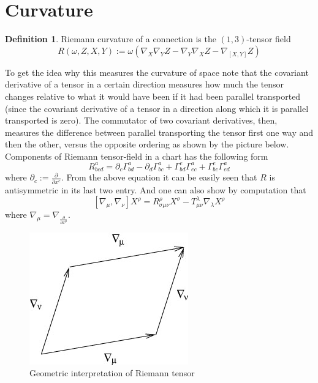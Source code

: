 \documentclass[a4paper]{report}
\theoremstyle{definition}
\newtheorem{definition}{Definition}[section]
\theoremstyle{remark}
\begin{document}
	\section{Curvature}
		\begin{definition}
			Riemann curvature of a connection is the $(1,3)$-tensor field
			\begin{equation*}
				R(\omega,Z,X,Y) := \omega\left(\nabla_X\nabla_YZ - \nabla_Y\nabla_XZ - \nabla_{[X,Y]}Z\right)
			\end{equation*}
		\end{definition}
		To get the idea why this measures the curvature of space note that the covariant derivative of a tensor in a certain direction measures how much the tensor changes relative to what it would have been if it had been parallel transported (since the covariant derivative of a tensor in a direction along which it is parallel transported is zero). The commutator of two covariant derivatives, then, measures the difference between parallel transporting the tensor first one way and then the other, versus the opposite ordering as shown by the picture below. 
		Components of Riemann tensor-field in a chart has the following form
		\begin{equation*}
			R^{a}_{bcd} = \partial_c\Gamma^{a}_{bd} - \partial_d\Gamma^{a}_{bc} +\Gamma^{e}_{bd}\Gamma^{a}_{ec} + \Gamma^{e}_{bc}\Gamma^{a}_{ed}
		\end{equation*}
		where $\partial_c := \tfrac{\partial}{\partial x^c}$. From the above equation it can be easily seen that $R$ is antisymmetric in its last two entry.
		And one can also show by computation that
		\begin{equation*}
			\left[\nabla_{\mu},\nabla_{\nu}\right]X^{\rho} = R_{\sigma \mu \nu}^{\rho}X^{\sigma} - T_{\mu \nu}^{\lambda}\nabla_{\lambda}X^{\rho}
		\end{equation*}
		where $\nabla_{\mu} = \nabla_{\tfrac{\partial}{\partial x^\mu}}$.
		\begin{figure}[H]
			\centering
			\includegraphics[scale=0.5]{image/cr}
			\caption{Geometric interpretation of Riemann tensor}
		\end{figure}
\end{document}
